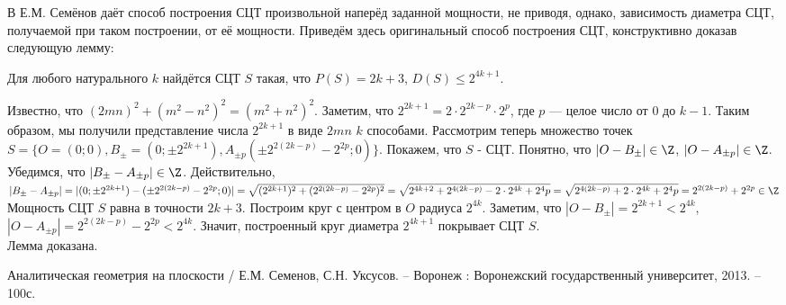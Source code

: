 \documentclass[a4paper,14pt]{article}
\begin{document}
В \cite{angem1kurs} Е.М. Семёнов даёт способ построения СЦТ произвольной наперёд заданной мощности, не приводя, однако, зависимость диаметра СЦТ, получаемой при таком построении, от её мощности.
Приведём здесь оригинальный способ построения СЦТ, конструктивно доказав следующую лемму:

\begin{lemma}
	Для любого натурального $k$ найдётся СЦТ $S$ такая, что $P(S)=2k+3$, $D(S)\leq 2^{4k+1}$.
\end{lemma}

\dokvo
	Известно, что $(2mn)^2+(m^2-n^2)^2=(m^2+n^2)^2$.
	Заметим, что $2^{2k+1} = 2 \cdot 2^{2k-p} \cdot 2^p$, где $p$ --- целое число от $0$ до $k-1$.
	Таким образом, мы получили представление числа $2^{2k+1}$ в виде $2mn$ $k$ способами.
	Рассмотрим теперь множество точек $S=\{O=(0;0),B_\pm=(0;\pm 2^{2k+1}),A_{\pm p}(\pm 2^{2(2k-p)}-2^{2p};0)\}$.
	Покажем, что $S$ - СЦТ.
	Понятно, что $|O-B_\pm|\in\Z$, $|O-A_{\pm p}|\in\Z$.
	Убедимся, что $|B_\pm-A_{\pm p}|\in\Z$.
	Действительно, $|B_\pm-A_{\pm p}|=|(0;\pm 2^{2k+1}) - (\pm 2^{2(2k-p)}-2^{2p};0)| = \sqrt{(2^{2k+1})^2+(2^{2(2k-p)}-2^{2p})^2}=
	\sqrt{2^{4k+2}+2^{4(2k-p)}-2\cdot 2^{4k}+2^4p}=\sqrt{2^{4(2k-p)}+2\cdot 2^{4k}+2^4p}=2^{2(2k-p)}+2^{2p}\in\Z$
	Мощность СЦТ $S$ равна в точности $2k+3$.
	Построим круг с центром в $O$ радиуса $2^{4k}$.
	Заметим, что $|O-B_\pm|=2^{2k+1}<2^{4k}$, $|O-A_{\pm p}| = 2^{2(2k-p)}-2^{2p} < 2^{4k}$.
	Значит, построенный круг диаметра $2^{4k+1}$ покрывает СЦТ $S$.
\\ Лемма доказана.


\begin{thebibliography}{99}

 Аналитическая геометрия на плоскости / Е.М. Семенов, С.Н. Уксусов. – Воронеж : Воронежский государственный университет, 2013. – 100с.

\end{thebibliography}
\end{document}
